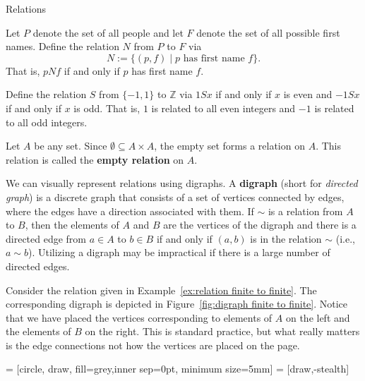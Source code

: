 \begin{section}{Relations}
\begin{example}
Let $P$ denote the set of all people and let $F$ denote the set of all possible first names.  Define the relation $N$ from $P$ to $F$ via
\[
N:=\{(p,f)\mid p\text{ has first name }f\}.
\]
That is, $pNf$ if and only if $p$ has first name $f$. 
\end{example}


\begin{example}
Define the relation $S$ from $\{-1,1\}$ to $\mathbb{Z}$ via $1Sx$ if and only if $x$ is even and $-1Sx$ if and only if $x$ is odd.  That is, $1$ is related to all even integers and $-1$ is related to all odd integers.
\end{example}

\begin{example}
Let $A$ be any set.  Since $\emptyset \subseteq A\times A$, the empty set forms a relation on $A$. This relation is called the \textbf{empty relation} on $A$.
\end{example}

We can visually represent relations using digraphs. A \textbf{digraph} (short for \emph{directed graph}) is a discrete graph that consists of a set of vertices connected by edges, where the edges have a direction associated with them. If $\sim$ is a relation from $A$ to $B$, then the elements of $A$ and $B$ are the vertices of the digraph and there is a directed edge from $a\in A$ to $b\in B$ if and only if $(a,b)$ is in the relation $\sim$ (i.e., $a\sim b$).  Utilizing a digraph may be impractical if there is a large number of directed edges.

\begin{example}
Consider the relation given in Example~\ref{ex:relation finite to finite}.  The corresponding digraph is depicted in Figure~\ref{fig:digraph finite to finite}. Notice that we have placed the vertices corresponding to elements of $A$ on the left and the elements of $B$ on the right.  This is standard practice, but what really matters is the edge connections not how the vertices are placed on the page.
\end{example}

 = [circle, draw, fill=grey,inner sep=0pt, minimum size=5mm]
 = [draw,-stealth]


\end{section}
